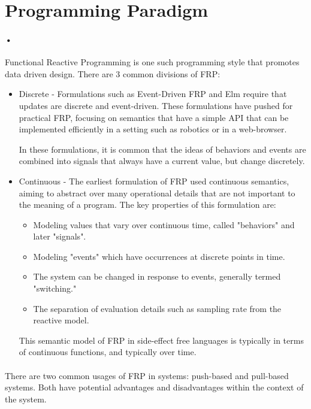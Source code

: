 \documentclass[11pt]{article}
\begin{document}
\pagebreak


\section{Programming Paradigm}
\paragraph{•}
Functional Reactive Programming is one such programming style that promotes data driven design. There are 3 common divisions of FRP:
\begin{itemize}
\item Discrete - Formulations such as Event-Driven FRP and Elm require that updates are discrete and event-driven. These formulations have pushed for practical FRP, focusing on semantics that have a simple API that can be implemented efficiently in a setting such as robotics or in a web-browser.

In these formulations, it is common that the ideas of behaviors and events are combined into signals that always have a current value, but change discretely.

\item Continuous - The earliest formulation of FRP used continuous semantics, aiming to abstract over many operational details that are not important to the meaning of a program. The key properties of this formulation are:
\begin{itemize}
\item Modeling values that vary over continuous time, called "behaviors" and later "signals".
\item Modeling "events" which have occurrences at discrete points in time.
\item The system can be changed in response to events, generally termed "switching."
\item The separation of evaluation details such as sampling rate from the reactive model.
\end{itemize}

This semantic model of FRP in side-effect free languages is typically in terms of continuous functions, and typically over time.
\end{itemize}

\paragraph{}
There are two common usages of FRP in systems: push-based and pull-based systems. Both have potential advantages and disadvantages within the context of the system.
\end{document}
